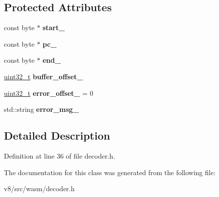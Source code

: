 \subsection*{Protected Attributes}
\begin{DoxyCompactItemize}
\item 
\mbox{\label{classv8_1_1internal_1_1wasm_1_1Decoder_a3a224fdaa731a53e1a83516a905648d3}} 
const byte $\ast$ {\bfseries start\+\_\+}
\item 
\mbox{\label{classv8_1_1internal_1_1wasm_1_1Decoder_a2773f5c96015330fcaa4c056527f71ce}} 
const byte $\ast$ {\bfseries pc\+\_\+}
\item 
\mbox{\label{classv8_1_1internal_1_1wasm_1_1Decoder_a091e7b1a0913396a619891eb692ece17}} 
const byte $\ast$ {\bfseries end\+\_\+}
\item 
\mbox{\label{classv8_1_1internal_1_1wasm_1_1Decoder_a45c4610b0e9eed7496e4f86bbfbc4b33}} 
\mbox{\hyperlink{classuint32__t}{uint32\+\_\+t}} {\bfseries buffer\+\_\+offset\+\_\+}
\item 
\mbox{\label{classv8_1_1internal_1_1wasm_1_1Decoder_a1fae7b4ab57dfec697007aecd4bbd666}} 
\mbox{\hyperlink{classuint32__t}{uint32\+\_\+t}} {\bfseries error\+\_\+offset\+\_\+} = 0
\item 
\mbox{\label{classv8_1_1internal_1_1wasm_1_1Decoder_a2a6d21259da7cfa9be841aff650f89c6}} 
std\+::string {\bfseries error\+\_\+msg\+\_\+}
\end{DoxyCompactItemize}


\subsection{Detailed Description}


Definition at line 36 of file decoder.\+h.



The documentation for this class was generated from the following file\+:\begin{DoxyCompactItemize}
\item 
v8/src/wasm/decoder.\+h\end{DoxyCompactItemize}
